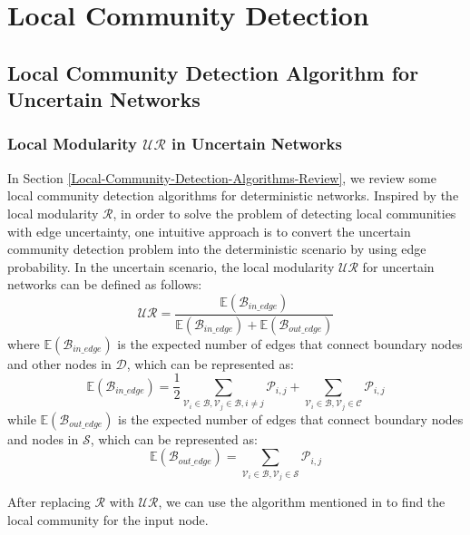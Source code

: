 \documentclass[\main/thesis.tex]{subfiles}
\begin{document}
\chapter{Local Community Detection}
\section{Local Community Detection Algorithm for Uncertain Networks}
\subsection{Local Modularity $\mathcal{UR}$ in Uncertain Networks}
In Section \ref{Local-Community-Detection-Algorithms-Review}, we review some local community detection algorithms for deterministic networks. Inspired by the local modularity $\mathcal{R}$, in order to solve the problem of detecting local communities with edge uncertainty, one intuitive approach is to convert the uncertain community detection problem into the deterministic scenario by using edge probability. In the uncertain scenario, the local modularity $\mathcal{UR}$ for uncertain networks can be defined as follows:
\begin{equation}
\mathcal{UR} = \frac{\mathbb{E}(\mathcal{B}_{in\_edge})}{\mathbb{E}(\mathcal{B}_{in\_edge})+\mathbb{E}(\mathcal{B}_{out\_edge})}
\label{UR-Local}
\end{equation}
where $\mathbb{E}(\mathcal{B}_{in\_edge})$ is the expected number of edges that connect boundary nodes and other nodes in $\mathcal{D}$, which can be represented as:
\begin{equation}
\mathbb{E}(\mathcal{B}_{in\_edge}) = \frac{1}{2}\sum_{\mathcal{V}_i\in \mathcal{B},\mathcal{V}_j\in \mathcal{B},i\neq j}\mathcal{P}_{i,j}+\sum_{\mathcal{V}_i\in \mathcal{B},\mathcal{V}_j\in \mathcal{C}}\mathcal{P}_{i,j}
\end{equation}
while $\mathbb{E}(\mathcal{B}_{out\_edge})$ is the expected number of edges that connect boundary nodes and nodes in $\mathcal{S}$, which can be represented as:
\begin{equation}
\mathbb{E}(\mathcal{B}_{out\_edge}) = \sum_{\mathcal{V}_i\in \mathcal{B},\mathcal{V}_j\in \mathcal{S}}\mathcal{P}_{i,j}
\end{equation}

After replacing $\mathcal{R}$ with $\mathcal{UR}$, we can use the algorithm mentioned in \cite{clauset2005finding,chen2009detecting} to find the local community for the input node. 
\end{document}

